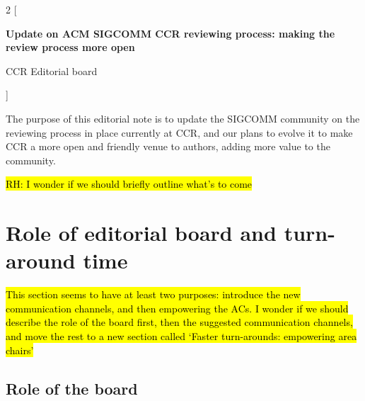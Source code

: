 \documentclass[letterpaper]{article}
\newcommand{\review}{Update on ACM SIGCOMM CCR reviewing process: making the review process more open}
\newcommand{\authors}{CCR Editorial board}
\begin{document}
\begin{multicols}{2}
[
\begin{center}{ \normalfont\sffamily\LARGE\bfseries{\review}}\end{center}
\begin{center}{\normalfont\sffamily\large {\authors}}\end{center}
]
\renewcommand{\sfdefault}{ptm}


The purpose of this editorial note is to update the SIGCOMM community on the
reviewing process in place currently at CCR, and our plans to evolve it to
make CCR a more open and friendly venue to authors, adding more value to
the community.

\hl{RH: I wonder if we should briefly outline what's to come}

\section{Role of editorial board and turn-around time}

\hl{This section seems to have at least two purposes: introduce the new
communication channels, and then empowering the ACs. I wonder if we should
describe the role of the board first, then the suggested communication
channels, and move the rest to a new section called `Faster turn-arounds:
empowering area chairs'}

\subsection{Role of the board}



\end{multicols}
\end{document}
